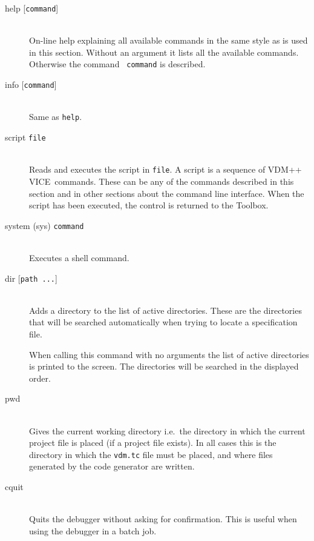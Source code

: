 \documentclass[\pformat,12pt]{article}
\newcommand{\vdmslpp}{VDM-SL}
\newcommand{\Toolbox}{Toolbox}
\newcommand{\vdmslpp}{VDM++}
\newcommand{\Toolbox}{Toolbox}
\renewcommand{\vdmslpp}{VDM++ VICE}
\begin{document}
\begin{description}
\item[help \mbox{[{\tt command}]}] \mbox{}\\
  On-line help explaining all available commands in
  the same style as is used in this section. Without an argument it
  lists all the available commands. Otherwise the command {\tt
    command} is described.

\item[info \mbox{[{\tt command}]}] \mbox{}\\
  Same as {\tt help}.

\item[script {\tt file}] \mbox{}\\
  Reads and executes the script in {\tt file}.  A script is a
  sequence of \vdmslpp\ commands.  These can be any of the commands
  described in this section and in other sections about the
  command line interface.  When the script has been executed, the
  control is returned to the \Toolbox.

\item[system (sys) {\tt command}]\mbox{}\\
  Executes a shell command.

\item[dir \mbox{[{\tt path ...}]}] \mbox{}\\
  Adds a directory to the list of active directories. These are the
  directories that will be searched automatically when trying to
  locate a specification file.
  
  When calling this command with no arguments the list of active
  directories is printed to the screen. The directories will be
  searched in the displayed order.

\item[pwd]  \mbox{}\\
  Gives the current working directory i.e.\ the directory in which
  the current project file is placed (if a project file exists). In
  all cases this is the directory in which the \texttt{vdm.tc} file must
  be placed, and where files generated by the code generator
   are written.

\item[cquit]  \mbox{}\\
  Quits the debugger without asking for confirmation.  This is useful
  when using the debugger in a batch job.


\end{description}
\end{document}

